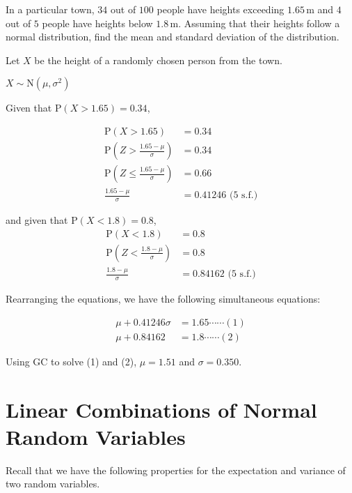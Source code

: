 \documentclass[11pt,a4paper]{book}
\begin{document}
\begin{example}

In a particular town, $34$ out of $100$ people have heights exceeding
$1.65\,\text{m}$ and $4$ out of $5$ people have heights below $1.8\,\text{m}$.
Assuming that their heights follow a normal distribution, find the
mean and standard deviation of the distribution.

\Solution

Let $X$ be the height of a randomly chosen person from the town.

$X\sim\text{N}\left(\mu,\sigma^{2}\right)$

Given that $\text{P}\left(X>1.65\right)=0.34$,

\begin{align*}
\text{P}\left(X>1.65\right) & =0.34\\
\text{P}\left(Z>\frac{1.65-\mu}{\sigma}\right) & =0.34\\
\text{P}\left(Z\leq\frac{1.65-\mu}{\sigma}\right) & =0.66\\
\frac{1.65-\mu}{\sigma} & =0.41246\text{ (5 s.f.)}
\end{align*}

and given that $\text{P}\left(X<1.8\right)=0.8$,
\begin{align*}
\text{P}\left(X<1.8\right) & =0.8\\
\text{P}\left(Z<\frac{1.8-\mu}{\sigma}\right) & =0.8\\
\frac{1.8-\mu}{\sigma} & =0.84162\text{ (5 s.f.)}
\end{align*}

Rearranging the equations, we have the following simultaneous equations:

\begin{align*}
\mu+0.41246\sigma & =1.65\cdots\cdots(1)\\
\mu+0.84162 & =1.8\cdots\cdots(2)
\end{align*}

Using GC to solve (1) and (2), $\mu=1.51$ and $\sigma=0.350$.

\end{example}

\newpage

\section{Linear Combinations of Normal Random Variables}

Recall that we have the following properties for the expectation and
variance of two random variables.
\end{document}
